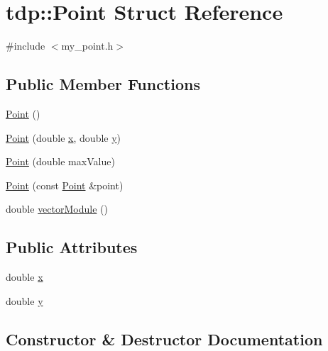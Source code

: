 \hypertarget{structtdp_1_1_point}{}\section{tdp\+:\+:Point Struct Reference}
\label{structtdp_1_1_point}


{\ttfamily \#include $<$my\+\_\+point.\+h$>$}

\subsection*{Public Member Functions}
\begin{DoxyCompactItemize}
\item 
\mbox{\hyperlink{structtdp_1_1_point_a3cf3dffca0486d5b72eb8fff8f5b2f52}{Point}} ()
\item 
\mbox{\hyperlink{structtdp_1_1_point_ab713435b69e5d6cfe3704739cf2eef1e}{Point}} (double \mbox{\hyperlink{structtdp_1_1_point_a31898184708346947177896af4c7eac6}{x}}, double \mbox{\hyperlink{structtdp_1_1_point_af46e9a346f374660a675336c2e619a69}{y}})
\item 
\mbox{\hyperlink{structtdp_1_1_point_a37a23b239ed2dcc7b803fb851b1c4c11}{Point}} (double max\+Value)
\item 
\mbox{\hyperlink{structtdp_1_1_point_af13c65c1b6d9a0cd1d5360eb29c8e1ce}{Point}} (const \mbox{\hyperlink{structtdp_1_1_point}{Point}} \&point)
\item 
double \mbox{\hyperlink{structtdp_1_1_point_a66681cb3fb742ab9dbe355c0784b8242}{vector\+Module}} ()
\end{DoxyCompactItemize}
\subsection*{Public Attributes}
\begin{DoxyCompactItemize}
\item 
double \mbox{\hyperlink{structtdp_1_1_point_a31898184708346947177896af4c7eac6}{x}}
\item 
double \mbox{\hyperlink{structtdp_1_1_point_af46e9a346f374660a675336c2e619a69}{y}}
\end{DoxyCompactItemize}


\subsection{Constructor \& Destructor Documentation}
\mbox{\label{structtdp_1_1_point_a3cf3dffca0486d5b72eb8fff8f5b2f52}} 
